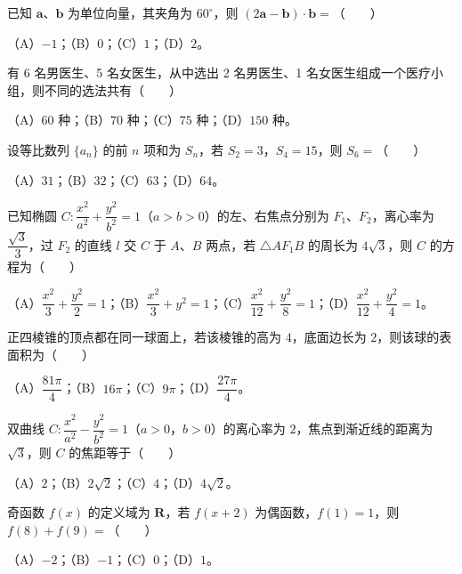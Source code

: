\begin{question}
已知 $\boldsymbol a$、$\boldsymbol b$ 为单位向量，其夹角为 $60^\circ$，则 $(2\boldsymbol a-\boldsymbol b)\cdot\boldsymbol b=$\mbox{（　　）}

（A）$-1$；（B）$0$；（C）$1$；（D）$2$。

\end{question}
\begin{question}
有 6 名男医生、5 名女医生，从中选出 2 名男医生、1 名女医生组成一个医疗小组，则不同的选法共有\mbox{（　　）}

（A）$60$ 种；（B）$70$ 种；（C）$75$ 种；（D）$150$ 种。

\end{question}
\begin{question}
设等比数列 $\{a_n\}$ 的前 $n$ 项和为 $S_n$，若 $S_2=3$，$S_4=15$，则 $S_6=$\mbox{（　　）}

（A）$31$；（B）$32$；（C）$63$；（D）$64$。

\end{question}
\begin{question}
已知椭圆 $C:\dfrac{x^2}{a^2}+\dfrac{y^2}{b^2}=1$（$a>b>0$）的左、右焦点分别为 $F_1$、$F_2$，离心率为 $\dfrac{\sqrt3}{3}$，过 $F_2$ 的直线 $l$ 交 $C$ 于 $A$、$B$ 两点，若 $\triangle AF_1B$ 的周长为 $4\sqrt3$，则 $C$ 的方程为\mbox{（　　）}

（A）$\dfrac{x^2}{3}+\dfrac{y^2}{2}=1$；（B）$\dfrac{x^2}{3}+y^2=1$；（C）$\dfrac{x^2}{12}+\dfrac{y^2}{8}=1$；（D）$\dfrac{x^2}{12}+\dfrac{y^2}{4}=1$。

\end{question}
\begin{question}
正四棱锥的顶点都在同一球面上，若该棱锥的高为 $4$，底面边长为 $2$，则该球的表面积为\mbox{（　　）}

（A）$\dfrac{81\pi}{4}$；（B）$16\pi$；（C）$9\pi$；（D）$\dfrac{27\pi}{4}$。

\end{question}
\begin{question}
双曲线 $C:\dfrac{x^2}{a^2}-\dfrac{y^2}{b^2}=1$（$a>0$，$b>0$）的离心率为 $2$，焦点到渐近线的距离为 $\sqrt3$，则 $C$ 的焦距等于\mbox{（　　）}

（A）$2$；（B）$2\sqrt2$；（C）$4$；（D）$4\sqrt2$。

\end{question}
\begin{question}
奇函数 $f(x)$ 的定义域为 $\mathbf R$，若 $f(x+2)$ 为偶函数，$f(1)=1$，则 $f(8)+f(9)=$\mbox{（　　）}

（A）$-2$；（B）$-1$；（C）$0$；（D）$1$。

\end{question}

